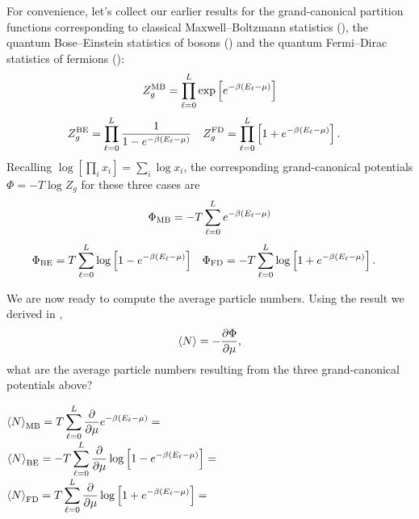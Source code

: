 For convenience, let's collect our earlier results for the grand-canonical partition functions corresponding to classical Maxwell--Boltzmann statistics (), the quantum Bose--Einstein statistics of bosons () and the quantum Fermi--Dirac statistics of fermions ():
\begin{equation*}
  Z_g^{\text{MB}} = \prod_{\ell = 0}^L \exp\left[e^{-\beta\left(E_{\ell} - \mu\right)}\right]
\end{equation*}
\begin{align*}
  Z_g^{\text{BE}} & = \prod_{\ell = 0}^L \frac{1}{1 - e^{-\beta (E_{\ell} - \mu)}} &
  Z_g^{\text{FD}} & = \prod_{\ell = 0}^L \left[1 + e^{-\beta (E_{\ell} - \mu)}\right].
\end{align*}
Recalling $\log\left[\prod_i x_i\right] = \sum_i \log x_i$, the corresponding grand-canonical potentials $\Phi = -T \log Z_g$ for these three cases are
\begin{equation*}
  \Phi_{\text{MB}} = -T \sum_{\ell = 0}^L e^{-\beta\left(E_{\ell} - \mu\right)}
\end{equation*}
\begin{align*}
  \Phi_{\text{BE}} & =  T \sum_{\ell = 0}^L \log\left[1 - e^{-\beta (E_{\ell} - \mu)}\right] &
  \Phi_{\text{FD}} & = -T \sum_{\ell = 0}^L \log\left[1 + e^{-\beta (E_{\ell} - \mu)}\right].
\end{align*}

\newpage %
We are now ready to compute the average particle numbers.
Using the result we derived in ,
\begin{equation*}
  \left\langle N \right\rangle = -\frac{\partial \Phi}{\partial \mu},
\end{equation*}
what are the average particle numbers resulting from the three grand-canonical potentials above?
\begin{mdframed}
  $\displaystyle \left\langle N \right\rangle_{\text{MB}} =  T \sum_{\ell = 0}^L \frac{\partial }{\partial \mu} e^{-\beta\left(E_{\ell} - \mu\right)} = $ \\[120 pt]
  $\displaystyle \left\langle N \right\rangle_{\text{BE}} = -T \sum_{\ell = 0}^L \frac{\partial }{\partial \mu} \log\left[1 - e^{-\beta (E_{\ell} - \mu)}\right] = $ \\[120 pt]
  $\displaystyle \left\langle N \right\rangle_{\text{FD}} =  T \sum_{\ell = 0}^L \frac{\partial }{\partial \mu} \log\left[1 + e^{-\beta (E_{\ell} - \mu)}\right] = $ \\[120 pt]
\end{mdframed}

